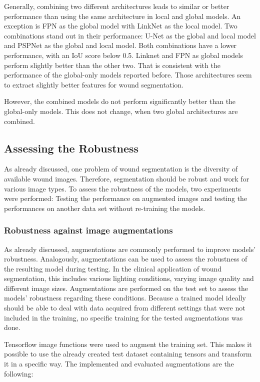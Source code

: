 Generally, combining two different architectures leads to similar or better performance than using the same architecture in local and global models. An exception is FPN as the global model with LinkNet as the local model. Two combinations stand out in their performance: U-Net as the global and local model and PSPNet as the global and local model. Both combinations have a lower performance, with an IoU score below 0.5. Linknet and FPN as global models perform slightly better than the other two. That is consistent with the performance of the global-only models reported before. Those architectures seem to extract slightly better features for wound segmentation.

However, the combined models do not perform significantly better than the global-only models. This does not change, when two global architectures are combined.

\subsection{Assessing the Robustness}

As already discussed, one problem of wound segmentation is the diversity of available wound images. Therefore, segmentation should be robust and work for various image types. To assess the robustness of the models, two experiments were performed: Testing the performance on augmented images and testing the performances on another data set without re-training the models.

\subsubsection{Robustness against image augmentations}

As already discussed, augmentations are commonly performed to improve models' robustness. Analogously, augmentations can be used to assess the robustness of the resulting model during testing. In the clinical application of wound segmentation, this includes various lighting conditions, varying image quality and different image sizes. Augmentations are performed on the test set to assess the models' robustness regarding these conditions. Because a trained model ideally should be able to deal with data acquired from different settings that were not included in the training, no specific training for the tested augmentations was done.

Tensorflow image functions were used to augment the training set. This makes it possible to use the already created test dataset containing tensors and transform it in a specific way. The implemented and evaluated augmentations are the following:

